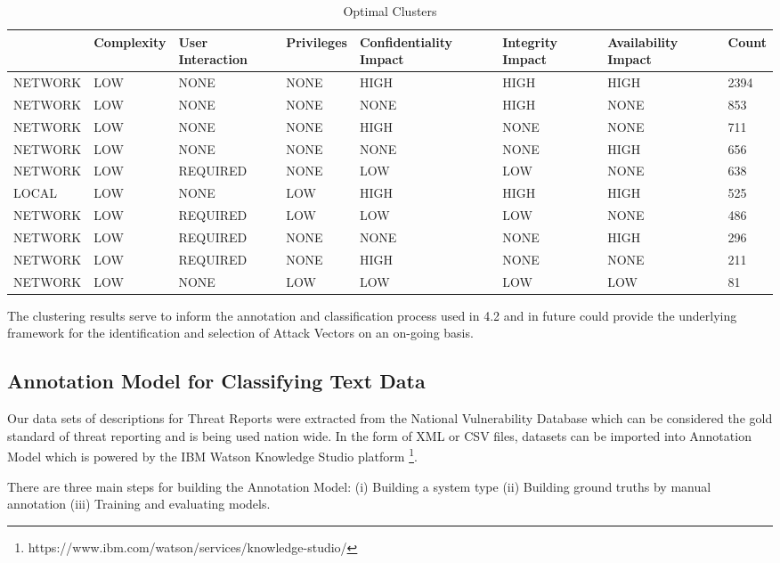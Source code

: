 \documentclass{article} %
\begin{document}
\begin{table}[h!]
\begin{center}
\begin{tabular}{ |l|p{1.1cm}|l|p{1.1cm}|p{1.4cm}|p{1.1cm}|p{1.4cm}|p{1.1cm}| } \hline
\small{Attack Vector & Complexity & User Interaction & Privileges & Confidentiality Impact & Integrity Impact & Availability Impact & Count} \\ \hline
NETWORK & LOW & NONE & NONE & HIGH & HIGH & HIGH & 2394 \\
NETWORK & LOW & NONE & NONE & NONE & HIGH & NONE & 853 \\
NETWORK & LOW & NONE & NONE & HIGH & NONE & NONE & 711 \\
NETWORK & LOW & NONE & NONE & NONE & NONE & HIGH & 656 \\
NETWORK & LOW & REQUIRED & NONE & LOW & LOW & NONE & 638 \\ 
LOCAL & LOW & NONE & LOW & HIGH & HIGH & HIGH & 525 \\
NETWORK & LOW & REQUIRED & LOW & LOW & LOW & NONE & 486 \\
NETWORK & LOW & REQUIRED & NONE & NONE & NONE & HIGH & 296 \\
NETWORK & LOW & REQUIRED & NONE & HIGH & NONE & NONE & 211 \\
NETWORK & LOW & NONE & LOW & LOW & LOW & LOW & 81 \\
\hline
\end{tabular}
\caption{Optimal Clusters}
\end{center}
\label{table:1}
\end{table}

The clustering results serve to inform the annotation and classification process used in 4.2 and in future could provide the underlying framework for the identification and selection of Attack Vectors on an on-going basis.


\subsection{Annotation Model for Classifying Text Data}
Our data sets of descriptions for Threat Reports were extracted from the National Vulnerability Database which can be considered the gold standard of threat reporting and is being used nation wide. In the form of XML or CSV files, datasets can be imported into Annotation Model which is powered by the IBM Watson Knowledge Studio platform \footnote{https://www.ibm.com/watson/services/knowledge-studio/}.

There are three main steps for building the Annotation Model: (i) Building a system type (ii) Building ground truths by manual annotation (iii) Training and evaluating models.
\end{document}
